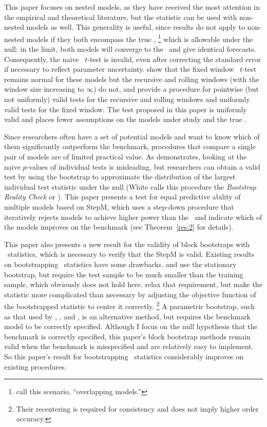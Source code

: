 \documentclass[12pt,fleqn]{article}
\begin{document}
This paper focuses on nested models, as they have received the most
attention in the empirical and theoretical literature, but the
statistic can be used with non-nested models as well.  This generality
is useful, since  results do not apply to non-nested
models if they both encompass the true \dgp,%
\footnote{\citet{ClM:11b}
  call this scenario, ``overlapping models.''} %
which is allowable
under the null: in the limit, both models will converge to the \dgp\
and give identical forecasts.  Consequently, the naive \oos\ $t$-test
is invalid, even after correcting the standard error if necessary to
reflect parameter uncertainty.  \citet{ClM:11b} show that the fixed
window \oos\ $t$-test remains normal for these models but the
recursive and rolling windows (with the window size increasing to
$\infty$) do not, and provide a procedure for pointwise (but not
uniformly) valid tests for the recursive and rolling windows and
uniformly valid tests for the fixed window.  The test proposed in this
paper is uniformly valid and places fewer assumptions on the models
under study and the true \dgp.

Since researchers often have a set of potential models and want to
know which of them significantly outperform the benchmark, procedures
that compare a single pair of models are of limited practical value.
As \citet{Whi:00} demonstrates, looking at the naive $p$-values of
individual tests is misleading, but researchers can obtain a valid test
by using the bootstrap to approximate the distribution of the largest
individual test statistic under the null (White calls this procedure
the \textit{Bootstrap Reality Check} or \brc).  This paper presents a test
for equal predictive ability of multiple models based on
 StepM, which uses a step-down procedure that
iteratively rejects models to achieve higher power than the \brc\ and
indicate which of the models improves on the benchmark (see
Theorem~\ref{res:2} for details).

This paper also presents a new result for the validity of block
bootstraps with \oos\ statistics, which is necessary to verify that
the StepM is valid.  Existing results on bootstrapping \oos\
statistics have some drawbacks.  \citet{Whi:00} and \citet{Han:05} use
the stationary bootstrap, but require the test sample to be much
smaller than the training sample, which obviously does not hold here.
\citet{CoS:07} relax that requirement, but make the statistic more
complicated than necessary by adjusting the objective function of the
bootstrapped statistic to center it correctly.%
\footnote{Their
  recentering is required for consistency and does not imply higher
  order accuracy.} %
A parametric bootstrap, such as that used by
\cite{Mar:95}, \cite{Lut:99}, and \citet{ClM:12b}, is an alternative
method, but requires the benchmark model to be correctly specified.
Although I focus on the null hypothesis that the benchmark is
correctly specified, this paper's block bootstrap methods remain valid
when the benchmark is misspecified and are relatively easy to
implement.  So this paper's result for bootstrapping \oos\ statistics
considerably improves on existing procedures.
\end{document}
